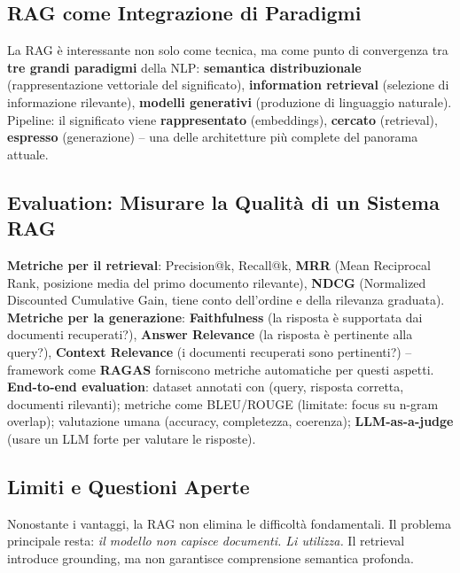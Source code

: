 \documentclass[12pt,a4paper]{article}
\begin{document}
\subsection{RAG come Integrazione di Paradigmi}

\begin{quizbox}
La RAG \`e interessante non solo come tecnica, ma come punto di convergenza tra \textbf{tre grandi paradigmi} della NLP: \textbf{semantica distribuzionale} (rappresentazione vettoriale del significato), \textbf{information retrieval} (selezione di informazione rilevante), \textbf{modelli generativi} (produzione di linguaggio naturale). Pipeline: il significato viene \textbf{rappresentato} (embeddings), \textbf{cercato} (retrieval), \textbf{espresso} (generazione) -- una delle architetture pi\`u complete del panorama attuale.
\end{quizbox}

\subsection{Evaluation: Misurare la Qualit\`a di un Sistema RAG}

\textbf{Metriche per il retrieval}: Precision@k, Recall@k, \textbf{MRR} (Mean Reciprocal Rank, posizione media del primo documento rilevante), \textbf{NDCG} (Normalized Discounted Cumulative Gain, tiene conto dell'ordine e della rilevanza graduata). \textbf{Metriche per la generazione}: \textbf{Faithfulness} (la risposta \`e supportata dai documenti recuperati?), \textbf{Answer Relevance} (la risposta \`e pertinente alla query?), \textbf{Context Relevance} (i documenti recuperati sono pertinenti?) -- framework come \textbf{RAGAS} forniscono metriche automatiche per questi aspetti. \textbf{End-to-end evaluation}: dataset annotati con (query, risposta corretta, documenti rilevanti); metriche come BLEU/ROUGE (limitate: focus su n-gram overlap); valutazione umana (accuracy, completezza, coerenza); \textbf{LLM-as-a-judge} (usare un LLM forte per valutare le risposte).

\subsection{Limiti e Questioni Aperte}

\begin{quizbox}
Nonostante i vantaggi, la RAG non elimina le difficolt\`a fondamentali. Il problema principale resta: \emph{il modello non capisce documenti. Li utilizza.} Il retrieval introduce grounding, ma non garantisce comprensione semantica profonda.
\end{quizbox}
\end{document}
